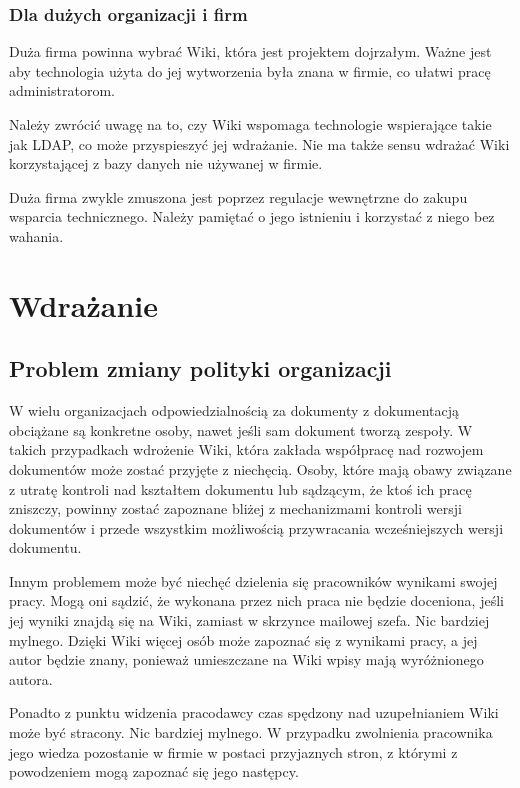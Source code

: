 \documentclass{article}
\begin{document}
		\subsubsection{Dla dużych organizacji i firm}
		

			Duża firma powinna wybrać Wiki, która jest projektem dojrzałym. Ważne jest aby technologia użyta do jej wytworzenia była znana w firmie, co ułatwi pracę administratorom.

			Należy zwrócić uwagę na to, czy Wiki wspomaga technologie wspierające takie jak LDAP, co może przyspieszyć jej wdrażanie. Nie ma także sensu wdrażać Wiki korzystającej z bazy danych nie używanej w firmie. 

			Duża firma zwykle zmuszona jest poprzez regulacje wewnętrzne do zakupu wsparcia technicznego. Należy pamiętać o jego istnieniu i korzystać z niego bez wahania.

\newpage
\section{Wdrażanie}
	\subsection{Problem zmiany polityki organizacji}


	W wielu organizacjach odpowiedzialnością za dokumenty z dokumentacją obciążane są konkretne osoby, nawet jeśli sam dokument tworzą zespoły. W takich przypadkach wdrożenie Wiki, która zakłada współpracę nad rozwojem dokumentów może zostać przyjęte z niechęcią. Osoby, które mają obawy związane z utratę kontroli nad kształtem dokumentu lub sądzącym, że ktoś ich pracę zniszczy, powinny zostać zapoznane bliżej z mechanizmami kontroli wersji dokumentów i przede wszystkim możliwością przywracania wcześniejszych wersji dokumentu. 

	Innym problemem może być niechęć dzielenia się pracowników wynikami swojej pracy. Mogą oni sądzić, że wykonana przez nich praca nie będzie doceniona, jeśli jej wyniki znajdą się na Wiki, zamiast w skrzynce mailowej szefa. Nic bardziej mylnego. Dzięki Wiki więcej osób może zapoznać się z wynikami pracy, a jej autor będzie znany, ponieważ umieszczane na Wiki wpisy mają wyróżnionego autora.

	Ponadto z punktu widzenia pracodawcy czas spędzony nad uzupełnianiem Wiki może być stracony. Nic bardziej mylnego. W przypadku zwolnienia pracownika jego wiedza pozostanie w firmie w postaci przyjaznych stron, z którymi z powodzeniem mogą zapoznać się jego następcy.
\end{document}
